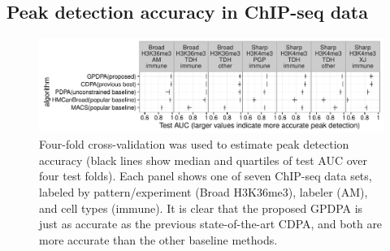 \documentclass[aoas]{imsart}
\newcommand{\url}[1]{\texttt{#1}}
\begin{document}



\subsection{Peak detection accuracy in ChIP-seq data}


\begin{figure}[t!]
  \centering 
  \includegraphics[width=\textwidth]{figure-test-error-dots}
  \vskip -0.5cm
  \caption{Four-fold cross-validation was used to estimate peak
    detection accuracy (black lines show median and quartiles of test
    AUC over four test folds). Each panel shows one of seven ChIP-seq data
    sets, labeled by pattern/experiment (Broad H3K36me3), labeler
    (AM), and cell types (immune).  It is clear that the proposed
    GPDPA is just as accurate as the previous state-of-the-art CDPA,
    and both are more accurate than the other baseline methods.
  }
  \label{fig:test-error-dots}
\end{figure}
\end{document}
